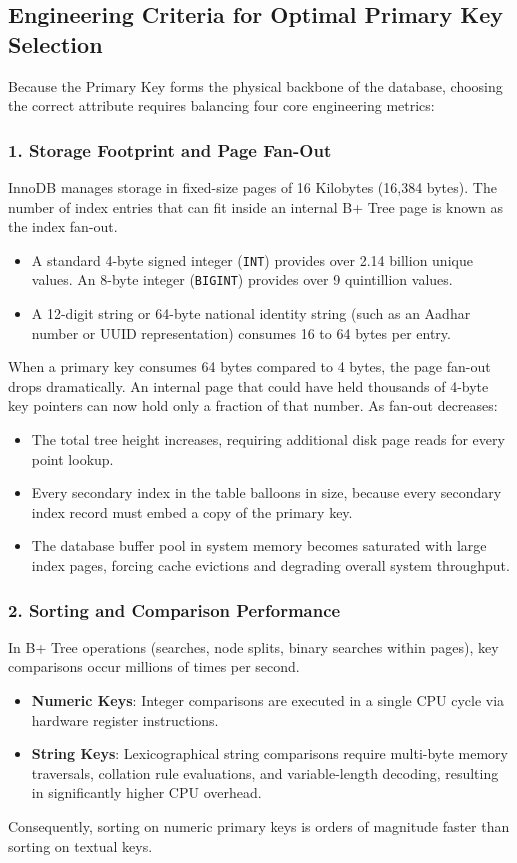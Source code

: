 \documentclass[10pt,journal,compsoc,onecolumn]{IEEEtran}
\begin{document}
\subsection{Engineering Criteria for Optimal Primary Key Selection}
Because the Primary Key forms the physical backbone of the database, choosing the correct attribute requires balancing four core engineering metrics:

\subsubsection{1. Storage Footprint and Page Fan-Out}
InnoDB manages storage in fixed-size pages of 16 Kilobytes (16,384 bytes). The number of index entries that can fit inside an internal B+ Tree page is known as the index fan-out. 
\begin{itemize}
    \item A standard 4-byte signed integer (\texttt{INT}) provides over 2.14 billion unique values. An 8-byte integer (\texttt{BIGINT}) provides over 9 quintillion values.
    \item A 12-digit string or 64-byte national identity string (such as an Aadhar number or UUID representation) consumes 16 to 64 bytes per entry.
\end{itemize}
When a primary key consumes 64 bytes compared to 4 bytes, the page fan-out drops dramatically. An internal page that could have held thousands of 4-byte key pointers can now hold only a fraction of that number. As fan-out decreases:
\begin{itemize}
    \item The total tree height increases, requiring additional disk page reads for every point lookup.
    \item Every secondary index in the table balloons in size, because every secondary index record must embed a copy of the primary key.
    \item The database buffer pool in system memory becomes saturated with large index pages, forcing cache evictions and degrading overall system throughput.
\end{itemize}

\subsubsection{2. Sorting and Comparison Performance}
In B+ Tree operations (searches, node splits, binary searches within pages), key comparisons occur millions of times per second. 
\begin{itemize}
    \item \textbf{Numeric Keys}: Integer comparisons are executed in a single CPU cycle via hardware register instructions.
    \item \textbf{String Keys}: Lexicographical string comparisons require multi-byte memory traversals, collation rule evaluations, and variable-length decoding, resulting in significantly higher CPU overhead.
\end{itemize}
Consequently, sorting on numeric primary keys is orders of magnitude faster than sorting on textual keys.
\end{document}
